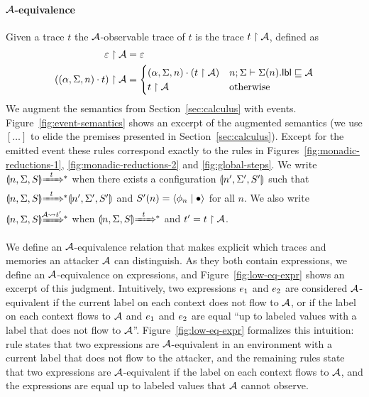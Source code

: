 \paragraph{$\mathcal{A}$-equivalence}
Given a trace $t$ the $\mathcal{A}$-observable trace of $t$ is the trace $t \upharpoonright \mathcal{A}$, defined as
\begin{align*}
\varepsilon \upharpoonright \mathcal{A} &= \varepsilon\\
((\alpha, \Sigma, n) \cdot t) \upharpoonright \mathcal{A} &=
\begin{cases}
(\alpha, \Sigma, n) \cdot (t \upharpoonright \mathcal{A}) & n; \Sigma \vdash \Sigma(n).\mathsf{lbl} \sqsubseteq \mathcal{A} \\
t \upharpoonright \mathcal{A} & \text{otherwise}
\end{cases}
\end{align*}
We augment the semantics from Section~\ref{sec:calculus} with events. Figure~\ref{fig:event-semantics} shows an excerpt of the augmented semantics (we use $[\ldots]$ to elide the premises presented in Section~\ref{sec:calculus}). Except for the emitted event these rules correspond exactly to the rules in Figures~\ref{fig:monadic-reductions-1}, \ref{fig:monadic-reductions-2} and \ref{fig:global-steps}. We write $\gconfig{n}{\env}{S} \gstepstos[][t]$ when there exists a configuration $\llparenthesis n', \Sigma', S' \rrparenthesis$ such that $\gconfig{n}{\env}{S} \gstepstos[][t] \gconfig{n'}{\env'}{S'}$ and $S'(n) = \langle \phi_n \mid \bullet \rangle$ for all $n$. We also write $\gconfig{n}{\env}{S} \gstepstos[][\Attacker \filtertrace t']$ when $\gconfig{n}{\env}{S} \gstepstos[][t]$ and $t' = t \upharpoonright \mathcal{A}$.

We define an $\mathcal{A}$-equivalence relation that makes explicit which traces and memories an attacker $\mathcal{A}$ can distinguish. As they both contain expressions, we define an $\mathcal{A}$-equivalence on expressions, and Figure~\ref{fig:low-eq-expr} shows an excerpt of this judgment. Intuitively, two expressions $e_1$ and $e_2$ are considered $\mathcal{A}$-equivalent if the current label on each context does not flow to $\mathcal{A}$, or if the label on each context flows to $\mathcal{A}$ and $e_1$ and $e_2$ are equal ``up to labeled values with a label that does not flow to $\mathcal{A}$''. Figure~\ref{fig:low-eq-expr} formalizes this intuition: rule  states that two expressions are $\mathcal{A}$-equivalent in an environment with a current label that does not flow to the attacker, and the remaining rules state that two expressions are $\mathcal{A}$-equivalent if the label on each context flows to $\mathcal{A}$, and the expressions are equal up to labeled values that $\mathcal{A}$ cannot observe.

